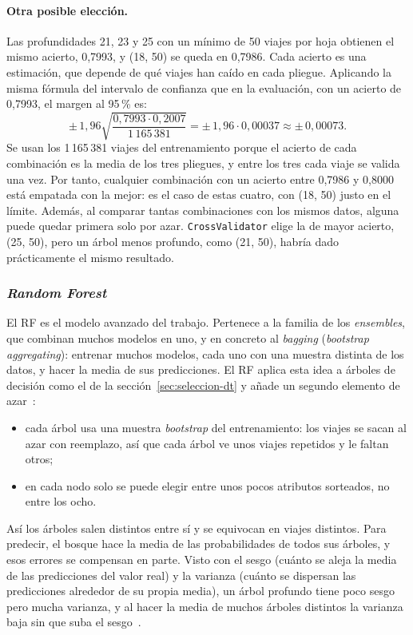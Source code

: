 \documentclass[12pt,a4paper]{article}
\begin{document}
 
\paragraph{Otra posible elección.} Las profundidades 21, 23 y 25 con un
mínimo de 50 viajes por hoja obtienen el mismo acierto, 0,7993, y (18, 50)
se queda en 0,7986. Cada acierto es una estimación, que depende de qué
viajes han caído en cada pliegue. Aplicando la misma fórmula del intervalo
de confianza que en la evaluación\cite[cap.~5]{mitchell1997}, con un acierto de
0,7993, el margen al 95\,\% es:
\[
\pm\, 1{,}96 \sqrt{\frac{0{,}7993 \cdot 0{,}2007}{1\,165\,381}}
= \pm\, 1{,}96 \cdot 0{,}00037
\approx \pm\, 0{,}00073 .
\]
Se usan los 1\,165\,381 viajes del entrenamiento porque el acierto de cada
combinación es la media de los tres pliegues, y entre los tres cada viaje
se valida una vez. Por tanto, cualquier combinación con un acierto entre
0,7986 y 0,8000 está empatada con la mejor: es el caso de estas cuatro, con
(18, 50) justo en el límite. Además, al comparar tantas combinaciones con
los mismos datos, alguna puede quedar primera solo por azar.
\texttt{CrossValidator} elige la de mayor acierto, (25, 50), pero un árbol
menos profundo, como (21, 50), habría dado prácticamente el mismo
resultado.

\subsubsection{\textit{Random Forest}}
\label{sec:seleccion-rf}

El \ac{RF} es el modelo avanzado del trabajo. Pertenece a la familia de los
\textit{ensembles}, que combinan muchos modelos en uno, y en concreto al
\textit{bagging} (\textit{bootstrap aggregating}): entrenar muchos modelos,
cada uno con una muestra distinta de los datos, y hacer la media de sus
predicciones. El \ac{RF} aplica esta idea a árboles de decisión como el de
la sección~\ref{sec:seleccion-dt} y añade un segundo elemento de
azar~\cite{spark_rf}:
\begin{itemize}
    \item cada árbol usa una muestra \textit{bootstrap} del entrenamiento:
    los viajes se sacan al azar con reemplazo, así que cada árbol ve unos
    viajes repetidos y le faltan otros;
    \item en cada nodo solo se puede elegir entre unos pocos atributos
    sorteados, no entre los ocho.
\end{itemize}
Así los árboles salen distintos entre sí y se equivocan en viajes
distintos. Para predecir, el bosque hace la media de las probabilidades de
todos sus árboles, y esos errores se compensan en parte. Visto con el
sesgo (cuánto se aleja la media de las predicciones del valor real) y la
varianza (cuánto se dispersan las predicciones alrededor de su propia
media), un árbol profundo tiene poco sesgo pero mucha varianza, y al hacer
la media de muchos árboles distintos la varianza baja sin que suba el
sesgo~\cite[cap.~7]{raschka2022}.
\end{document}
